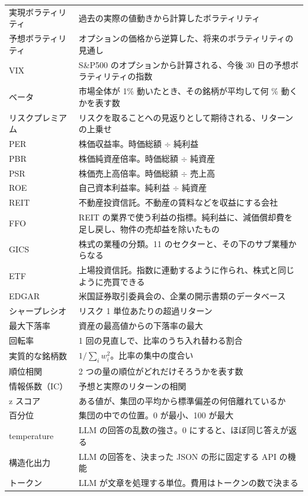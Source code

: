 \documentclass[xelatex,ja=standard,jafont=hiragino-pron,a4paper,10pt]{bxjsreport}
\newcommand{\SP}{S\&P500}
\begin{document}
\begin{longtable}{p{4.20cm}p{10.20cm}}
実現ボラティリティ & 過去の実際の値動きから計算したボラティリティ \\
予想ボラティリティ & オプションの価格から逆算した、将来のボラティリティの見通し \\
VIX & \SP{} のオプションから計算される、今後 30 日の予想ボラティリティの指数 \\
ベータ & 市場全体が 1\% 動いたとき、その銘柄が平均して何 \% 動くかを表す数 \\
リスクプレミアム & リスクを取ることへの見返りとして期待される、リターンの上乗せ \\
PER & 株価収益率。時価総額 $\div$ 純利益 \\
PBR & 株価純資産倍率。時価総額 $\div$ 純資産 \\
PSR & 株価売上高倍率。時価総額 $\div$ 売上高 \\
ROE & 自己資本利益率。純利益 $\div$ 純資産 \\
REIT & 不動産投資信託。不動産の賃料などを収益にする会社 \\
FFO & REIT の業界で使う利益の指標。純利益に、減価償却費を足し戻し、物件の売却益を除いたもの \\
GICS & 株式の業種の分類。11 のセクターと、その下のサブ業種からなる \\
ETF & 上場投資信託。指数に連動するように作られ、株式と同じように売買できる \\
EDGAR & 米国証券取引委員会の、企業の開示書類のデータベース \\
シャープレシオ & リスク 1 単位あたりの超過リターン \\
最大下落率 & 資産の最高値からの下落率の最大 \\
回転率 & 1 回の見直しで、比率のうち入れ替わる割合 \\
実質的な銘柄数 & $1/\sum_i w_i^2$。比率の集中の度合い \\
順位相関 & 2 つの量の順位がどれだけそろうかを表す数 \\
情報係数（IC） & 予想と実際のリターンの相関 \\
z スコア & ある値が、集団の平均から標準偏差の何倍離れているか \\
百分位 & 集団の中での位置。0 が最小、100 が最大 \\
temperature & LLM の回答の乱数の強さ。0 にすると、ほぼ同じ答えが返る \\
構造化出力 & LLM の回答を、決まった JSON の形に固定する API の機能 \\
トークン & LLM が文章を処理する単位。費用はトークンの数で決まる \\
\end{longtable}
\end{document}
